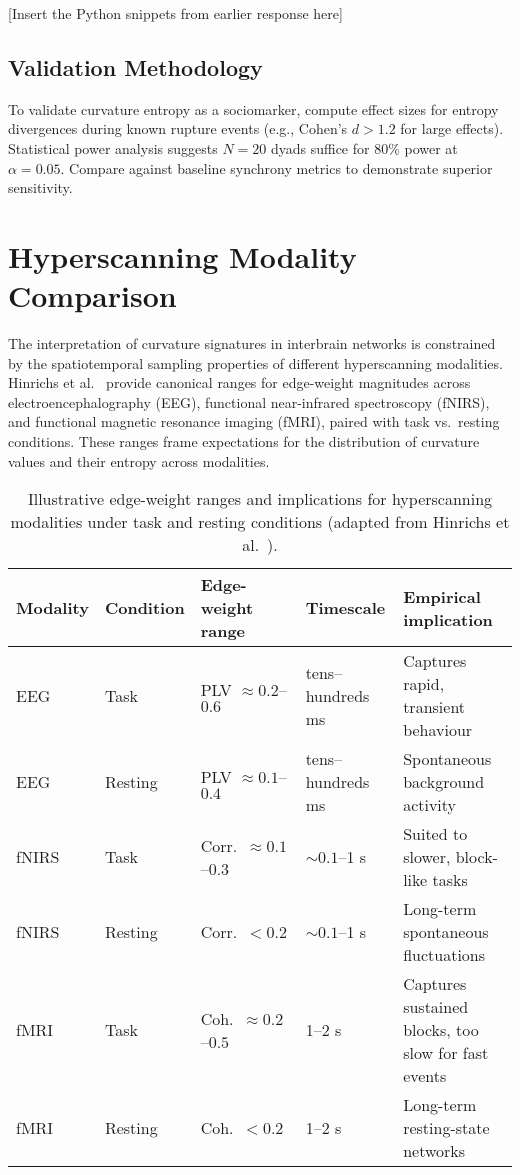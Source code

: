 \documentclass{article}
\theoremstyle{definition}
\begin{document}
[Insert the Python snippets from earlier response here]

\subsection{Validation Methodology}

To validate curvature entropy as a sociomarker, compute effect sizes for entropy
divergences during known rupture events (e.g., Cohen's $d > 1.2$ for large
effects). Statistical power analysis suggests $N=20$ dyads suffice for 80\% power
at $\alpha=0.05$. Compare against baseline synchrony metrics to demonstrate
superior sensitivity.

\section{Hyperscanning Modality Comparison}

The interpretation of curvature signatures in interbrain networks is constrained
by the spatiotemporal sampling properties of different hyperscanning modalities.
Hinrichs et al.~\cite{hinrichs2025geometry} provide canonical ranges for
edge-weight magnitudes across electroencephalography (EEG), functional near-infrared
spectroscopy (fNIRS), and functional magnetic resonance imaging (fMRI), paired
with task vs.\ resting conditions. These ranges frame expectations for the
distribution of curvature values and their entropy across modalities.

\begin{table}[H]
\centering
\caption{Illustrative edge-weight ranges and implications for hyperscanning modalities under task and resting conditions (adapted from Hinrichs et al.~\cite{hinrichs2025geometry}).}
\label{tab:modality-comparison}
\begin{tabularx}{\textwidth}{@{}p{1.5cm} p{1.8cm} p{2.5cm} p{2cm} X@{}}
\toprule
\textbf{Modality} & \textbf{Condition} & \textbf{Edge-weight range} & \textbf{Timescale} & \textbf{Empirical implication} \\
\midrule
EEG   & Task    & PLV $\approx 0.2$--$0.6$ & tens--hundreds ms & Captures rapid, transient behaviour \\
EEG   & Resting & PLV $\approx 0.1$--$0.4$ & tens--hundreds ms & Spontaneous background activity \\
\addlinespace
fNIRS & Task    & Corr.\ $\approx 0.1$--$0.3$ & $\sim 0.1$--1 s & Suited to slower, block-like tasks \\
fNIRS & Resting & Corr.\ $< 0.2$ & $\sim 0.1$--1 s & Long-term spontaneous fluctuations \\
\addlinespace
fMRI  & Task    & Coh.\ $\approx 0.2$--$0.5$ & 1--2 s & Captures sustained blocks, too slow for fast events \\
fMRI  & Resting & Coh.\ $< 0.2$ & 1--2 s & Long-term resting-state networks \\
\bottomrule
\end{tabularx}
\end{table}
\end{document}
